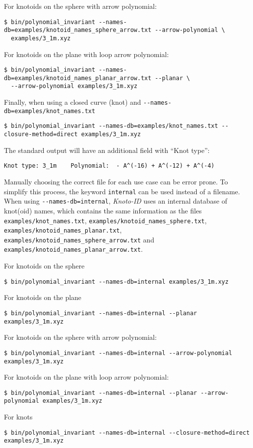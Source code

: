 For knotoids on the sphere with arrow polynomial:
\begin{lstlisting}
$ bin/polynomial_invariant --names-db=examples/knotoid_names_sphere_arrow.txt --arrow-polynomial \
  examples/3_1m.xyz
\end{lstlisting}
For knotoids on the plane with loop arrow polynomial:
\begin{lstlisting}
$ bin/polynomial_invariant --names-db=examples/knotoid_names_planar_arrow.txt --planar \
  --arrow-polynomial examples/3_1m.xyz
\end{lstlisting}
Finally,  when using a closed curve (knot) and \lstinline{--names-db=examples/knot_names.txt}
\begin{lstlisting}
$ bin/polynomial_invariant --names-db=examples/knot_names.txt --closure-method=direct examples/3_1m.xyz
\end{lstlisting}
The standard output will have an additional field with ``Knot type'':
\begin{lstlisting}
Knot type: 3_1m    Polynomial:  - A^(-16) + A^(-12) + A^(-4)
\end{lstlisting}
Manually choosing the correct file for each use case can be error prone. To simplify this process, the keyword \lstinline{internal} can be used instead of a filename. When using  \lstinline{--names-db=internal}, {\it Knoto-ID} uses an internal database of knot(oid) names, which contains the same information as the files  \lstinline{examples/knot_names.txt}, \lstinline{examples/knotoid_names_sphere.txt}, \lstinline{examples/knotoid_names_planar.txt},\\
\lstinline{examples/knotoid_names_sphere_arrow.txt} and \lstinline{examples/knotoid_names_planar_arrow.txt}. 

For knotoids on the sphere
\begin{lstlisting}
$ bin/polynomial_invariant --names-db=internal examples/3_1m.xyz
\end{lstlisting}
For knotoids on the plane
\begin{lstlisting}
$ bin/polynomial_invariant --names-db=internal --planar examples/3_1m.xyz
\end{lstlisting}
For knotoids on the sphere with arrow polynomial:
\begin{lstlisting}
$ bin/polynomial_invariant --names-db=internal --arrow-polynomial examples/3_1m.xyz
\end{lstlisting}
For knotoids on the plane with loop arrow polynomial:
\begin{lstlisting}
$ bin/polynomial_invariant --names-db=internal --planar --arrow-polynomial examples/3_1m.xyz
\end{lstlisting}
For knots
\begin{lstlisting}
$ bin/polynomial_invariant --names-db=internal --closure-method=direct examples/3_1m.xyz
\end{lstlisting}



